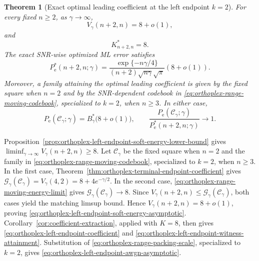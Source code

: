 \documentclass[12pt,draftclsnofoot,onecolumn]{IEEEtran}
\newcommand{\cC}{\mathcal{C}}
\newcommand{\cG}{\mathcal{G}}
\newcommand{\Pe}{P_{\mathrm e}}
\newtheorem{theorem}{Theorem}
\theoremstyle{definition}
\begin{document}
\begin{theorem}[Exact optimal leading coefficient at the left endpoint \(k=2\)]
\label{thm:orthoplex-left-endpoint-coefficient}
For every fixed \(n\ge2\), as \(\gamma\to\infty\),
\begin{equation}
  V_\gamma(n+2,n)=8+o(1),
  \label{eq:orthoplex-left-endpoint-soft-energy-asymptotic}
\end{equation}
and
\begin{equation}
  K^{\ast}_{n+2,n}=8.
  \label{eq:orthoplex-left-endpoint-coefficient}
\end{equation}
The exact SNR-wise optimized ML error satisfies
\begin{equation}
  \Pe^{\ast}(n+2,n;\gamma)
  =
  \frac{\exp\{-n\gamma/4\}}
  {(n+2)\sqrt{n\gamma}\sqrt{\pi}}
  \left(8+o(1)\right).
  \label{eq:orthoplex-left-endpoint-awgn-asymptotic}
\end{equation}
Moreover, a family attaining the optimal leading coefficient is given by the fixed square
when \(n=2\) and by the SNR-dependent codebook in
\eqref{eq:orthoplex-range-moving-codebook}, specialized to \(k=2\),
when \(n\ge3\).  In either case,
\begin{equation}
  \Pe(\cC_\gamma;\gamma)
  =B_\gamma^{\ast}\bigl(8+o(1)\bigr),
  \qquad
  \frac{\Pe(\cC_\gamma;\gamma)}
  {\Pe^{\ast}(n+2,n;\gamma)}
  \longrightarrow1.
  \label{eq:orthoplex-left-endpoint-witness-attainment}
\end{equation}
\end{theorem}

\begin{IEEEproof}
Proposition~\ref{prop:orthoplex-left-endpoint-soft-energy-lower-bound}
gives
\(\liminf_{\gamma\to\infty}V_\gamma(n+2,n)\ge8\).  Let
\(\cC_\gamma\) be the fixed square when \(n=2\) and the family in
\eqref{eq:orthoplex-range-moving-codebook}, specialized to \(k=2\), when
\(n\ge3\).  In the first case,
Theorem~\ref{thm:orthoplex-terminal-endpoint-coefficient} gives
\(\cG_\gamma(\cC_\gamma)=V_\gamma(4,2)=8+4e^{-\gamma/2}\).  In the
second case, \eqref{eq:orthoplex-range-moving-energy-limit} gives
\(\cG_\gamma(\cC_\gamma)\to8\).  Since
\(V_\gamma(n+2,n)\le\cG_\gamma(\cC_\gamma)\), both cases yield the
matching limsup bound.  Hence \(V_\gamma(n+2,n)=8+o(1)\), proving
\eqref{eq:orthoplex-left-endpoint-soft-energy-asymptotic}.
Corollary~\ref{cor:coefficient-extraction}, applied with \(K=8\), then
gives \eqref{eq:orthoplex-left-endpoint-coefficient} and
\eqref{eq:orthoplex-left-endpoint-witness-attainment}.  Substitution of
\eqref{eq:orthoplex-range-packing-scale}, specialized to \(k=2\), gives
\eqref{eq:orthoplex-left-endpoint-awgn-asymptotic}.
\end{IEEEproof}
\end{document}

